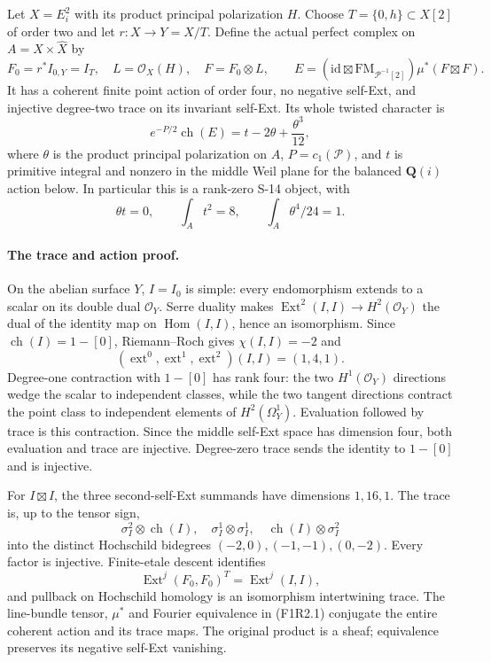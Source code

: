 Let $X=E_i^2$ with its product principal polarization $H$. Choose
$T=\{0,h\}\subset X[2]$ of order two and let $r:X\to Y=X/T$.
Define the actual perfect complex on $A=X\times\widehat X$ by
\[
 F_0=r^*I_{0,Y}=I_T,\quad L=\mathcal O_X(H),\quad F=F_0\otimes L,
 \qquad
 E=(\mathrm{id}\boxtimes\mathrm{FM}_{\mathcal P^{-1}[2]})
                        \mu^*(F\boxtimes F).
 \tag{F1R2.1}
\]
It has a coherent finite point action of order four, no negative
self-Ext, and injective degree-two trace on its invariant self-Ext.
Its whole twisted character is
\[
               e^{-P/2}\operatorname{ch}(E)
                       =t-2\theta+\frac{\theta^3}{12},
 \tag{F1R2.2}
\]
where $\theta$ is the product principal polarization on $A$,
$P=c_1(\mathcal P)$, and $t$ is primitive integral and nonzero in
the middle Weil plane for the balanced $\mathbf Q(i)$ action below.
In particular this is a rank-zero S-14 object, with
\[
                  \theta t=0,\qquad\int_A t^2=8,
                  \qquad\int_A\theta^4/24=1.
 \tag{F1R2.3}
\]

\paragraph{The trace and action proof.}
On the abelian surface $Y$, $I=I_0$ is simple: every endomorphism
extends to a scalar on its double dual $\mathcal O_Y$. Serre
duality makes $\operatorname{Ext}^2(I,I)\to H^2(\mathcal O_Y)$
the dual of the identity map on $\operatorname{Hom}(I,I)$, hence
an isomorphism. Since $\operatorname{ch}(I)=1-[0]$, Riemann--Roch
gives $\chi(I,I)=-2$ and
\[
                  (\operatorname{ext}^0,\operatorname{ext}^1,
                    \operatorname{ext}^2)(I,I)=(1,4,1).
\]
Degree-one contraction with $1-[0]$ has rank four: the two
$H^1(\mathcal O_Y)$ directions wedge the scalar to independent
classes, while the two tangent directions contract the point class
to independent elements of $H^2(\Omega_Y^1)$. Evaluation followed
by trace is this contraction. Since the middle self-Ext space has
dimension four, both evaluation and trace are injective. Degree-zero
trace sends the identity to $1-[0]$ and is injective.

For $I\boxtimes I$, the three second-self-Ext summands have
dimensions $1,16,1$. The trace is, up to the tensor sign,
\[
 \sigma_I^2\otimes\operatorname{ch}(I),\quad
 \sigma_I^1\otimes\sigma_I^1,\quad
 \operatorname{ch}(I)\otimes\sigma_I^2
 \tag{F1R2.4}
\]
into the distinct Hochschild bidegrees $(-2,0),(-1,-1),(0,-2)$.
Every factor is injective. Finite-etale descent identifies
\[
 \operatorname{Ext}^j(F_0,F_0)^T
                      =\operatorname{Ext}^j(I,I),
\]
and pullback on Hochschild homology is an isomorphism intertwining
trace. The line-bundle tensor, $\mu^*$ and Fourier equivalence in
(F1R2.1) conjugate the entire coherent action and its trace maps.
The original product is a sheaf; equivalence preserves its negative
self-Ext vanishing.

